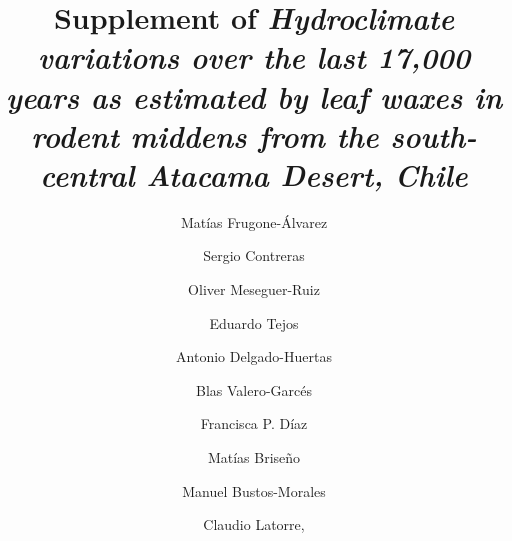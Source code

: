 \documentclass[
  authoryear,
  preprint,
  3p]{elsarticle}
\begin{document}
\begin{frontmatter}
\title{Supplement of \emph{Hydroclimate variations over the last 17,000
years as estimated by leaf waxes in rodent middens from the
south-central Atacama Desert, Chile}}
\author[1,2,3]{Matías Frugone-Álvarez%
%
}
\author[1,5]{Sergio Contreras%
%
}
\author[6]{Oliver Meseguer-Ruiz%
%
}

\author[1]{Eduardo Tejos%
%
}

\author[7]{Antonio Delgado-Huertas%
%
}

\author[8]{Blas Valero-Garcés%
%
}

\author[9,2,10]{Francisca P. Díaz%
%
}

\author[11]{Matías Briseño%
%
}

\author[11]{Manuel Bustos-Morales%
%
}

\author[11,9,3]{Claudio Latorre,%
%
}


\end{frontmatter}
\end{document}
